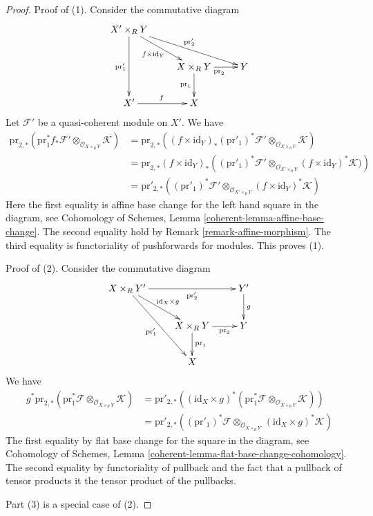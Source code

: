 \documentclass{stacks-project}
\theoremstyle{plain}
\theoremstyle{definition}
\theoremstyle{remark}
\numberwithin{equation}{subsection}
\begin{document}
\begin{proof}
Proof of (1). Consider the commutative diagram
$$
\xymatrix{
X' \times_R Y \ar[rrd]^{\text{pr}'_2} \ar[rd]_{f \times \text{id}_Y}
\ar[dd]_{\text{pr}'_1} \\
& X \times_R Y \ar[r]_{\text{pr}_2} \ar[d]_{\text{pr}_1} & Y \\
X' \ar[r]^f & X
}
$$
Let $\mathcal{F}'$ be a quasi-coherent module on $X'$. We have
\begin{align*}
\text{pr}_{2, *}(\text{pr}_1^*f_*\mathcal{F}'
\otimes_{\mathcal{O}_{X \times_R Y}} \mathcal{K})
& =
\text{pr}_{2, *}((f \times \text{id}_Y)_*
(\text{pr}'_1)^*\mathcal{F}'
\otimes_{\mathcal{O}_{X \times_R Y}} \mathcal{K}) \\
& =
\text{pr}_{2, *}(f \times \text{id}_Y)_*
\left((\text{pr}'_1)^*\mathcal{F}'
\otimes_{\mathcal{O}_{X' \times_R Y}}
(f \times \text{id}_Y)^*\mathcal{K})\right)  \\
& =
\text{pr}'_{2, *}((\text{pr}'_1)^*\mathcal{F}'
\otimes_{\mathcal{O}_{X' \times_R Y}} (f \times \text{id}_Y)^*\mathcal{K})
\end{align*}
Here the first equality is affine base change for the left hand
square in the diagram, see
Cohomology of Schemes, Lemma \ref{coherent-lemma-affine-base-change}.
The second equality hold by Remark \ref{remark-affine-morphism}.
The third equality is functoriality of pushforwards for modules.
This proves (1).

\medskip\noindent
Proof of (2). Consider the commutative diagram
$$
\xymatrix{
X \times_R Y' \ar[rr]_-{\text{pr}'_2} \ar[rd]^{\text{id}_X \times g}
\ar[rdd]_{\text{pr}'_1} & & Y' \ar[d]^g \\
& X \times_R Y \ar[r]_-{\text{pr}_2} \ar[d]^{\text{pr}_1} & Y \\
& X
}
$$
We have
\begin{align*}
g^*\text{pr}_{2, *}(\text{pr}_1^*\mathcal{F}
\otimes_{\mathcal{O}_{X \times_R Y}} \mathcal{K})
& =
\text{pr}'_{2, *}(
(\text{id}_X \times g)^*(
\text{pr}_1^*\mathcal{F} \otimes_{\mathcal{O}_{X \times_R Y}} \mathcal{K})) \\
& =
\text{pr}'_{2, *}((\text{pr}'_1)^*\mathcal{F}
\otimes_{\mathcal{O}_{X \times_R Y'}}
(\text{id}_X \times g)^*\mathcal{K})
\end{align*}
The first equality by flat base change for the square in the diagram, see
Cohomology of Schemes, Lemma \ref{coherent-lemma-flat-base-change-cohomology}.
The second equality by functoriality of pullback and the fact that
a pullback of tensor products it the tensor product of the pullbacks.

\medskip\noindent
Part (3) is a special case of (2).
\end{proof}
\end{document}
